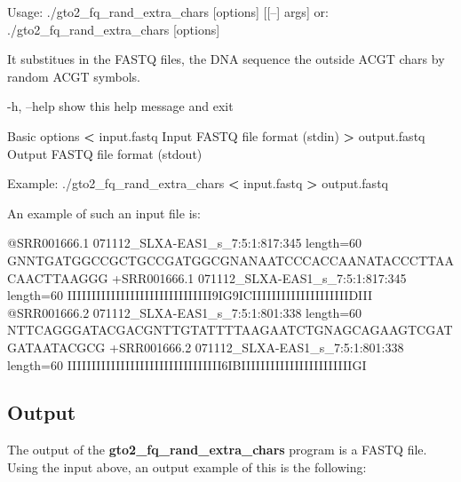 \documentclass[11pt,]{krantz}
\newenvironment{Shaded}{\begin{snugshade}}{\end{snugshade}}
\newcommand{\OperatorTok}[1]{\textcolor[rgb]{0.43,0.43,0.43}{\textbf{#1}}}
\newcommand{\ExtensionTok}[1]{#1}
\newcommand{\NormalTok}[1]{#1}
\begin{document}
\begin{Shaded}
\begin{Highlighting}[]
\ExtensionTok{Usage}\NormalTok{: ./gto2_fq_rand_extra_chars [options] [[--] args]}
   \ExtensionTok{or}\NormalTok{: ./gto2_fq_rand_extra_chars [options]}

\ExtensionTok{It}\NormalTok{ substitues in the FASTQ files, the DNA sequence the }
\ExtensionTok{outside}\NormalTok{ ACGT chars by random ACGT symbols.}

    \ExtensionTok{-h}\NormalTok{, --help            show this help message and exit}

\ExtensionTok{Basic}\NormalTok{ options}
    \OperatorTok{<} \ExtensionTok{input.fastq}\NormalTok{         Input FASTQ file format (stdin)}
    \OperatorTok{>} \ExtensionTok{output.fastq}\NormalTok{        Output FASTQ file format (stdout)}

\ExtensionTok{Example}\NormalTok{: ./gto2_fq_rand_extra_chars }\OperatorTok{<}\NormalTok{ input.fastq }\OperatorTok{>} 
\ExtensionTok{output.fastq}
\end{Highlighting}
\end{Shaded}

An example of such an input file is:

\begin{Shaded}
\begin{Highlighting}[]
\ExtensionTok{@SRR001666.1}\NormalTok{ 071112_SLXA-EAS1_s_7:5:1:817:345 length=60}
\ExtensionTok{GNNTGATGGCCGCTGCCGATGGCGNANAATCCCACCAANATACCCTTAACAACTTAAGGG}
\ExtensionTok{+SRR001666.1}\NormalTok{ 071112_SLXA-EAS1_s_7:5:1:817:345 length=60}
\ExtensionTok{IIIIIIIIIIIIIIIIIIIIIIIIIIIIII9IG9ICIIIIIIIIIIIIIIIIIIIIDIII}
\ExtensionTok{@SRR001666.2}\NormalTok{ 071112_SLXA-EAS1_s_7:5:1:801:338 length=60}
\ExtensionTok{NTTCAGGGATACGACGNTTGTATTTTAAGAATCTGNAGCAGAAGTCGATGATAATACGCG}
\ExtensionTok{+SRR001666.2}\NormalTok{ 071112_SLXA-EAS1_s_7:5:1:801:338 length=60}
\ExtensionTok{IIIIIIIIIIIIIIIIIIIIIIIIIIIIIIII6IBIIIIIIIIIIIIIIIIIIIIIIIGI}
\end{Highlighting}
\end{Shaded}

\subsection*{Output}\label{output-8}


The output of the \textbf{gto2\_fq\_rand\_extra\_chars} program is a
FASTQ file. Using the input above, an output example of this is the
following:
\end{document}
